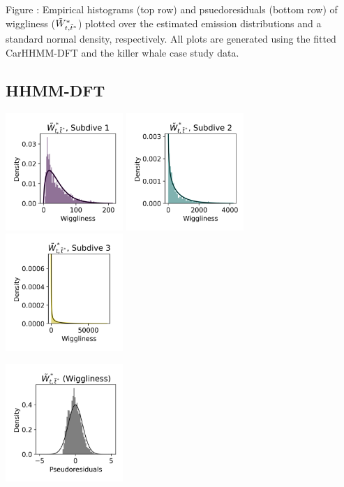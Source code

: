 \documentclass{article}
\begin{document}
        \noindent Figure : Empirical histograms (top row) and psuedoresiduals (bottom row) of wiggliness ($\tilde{W}^*_{t,\tilde t^*}$) plotted over the estimated emission distributions and a standard normal density, respectively. All plots are generated using the fitted CarHHMM-DFT and the killer whale case study data.
        \addtocounter{fignum}{1}
        
        \subsection{HHMM-DFT}
        
        \begin{center}
        \includegraphics[width=1.75in]{../Plots/2019/20190902-182840-CATs_OB_1_0_267_HHMM_empirical_hist_ahat_0.png}
        \includegraphics[width=1.75in]{../Plots/2019/20190902-182840-CATs_OB_1_0_267_HHMM_empirical_hist_ahat_1.png}
        \includegraphics[width=1.75in]{../Plots/2019/20190902-182840-CATs_OB_1_0_267_HHMM_empirical_hist_ahat_2.png}
        
        \includegraphics[width=1.75in]{../Plots/2019/20190902-182840-CATs_OB_1_0_267_HHMM_pseudresids_ahat.png}
        \end{center}
        
\end{document}
